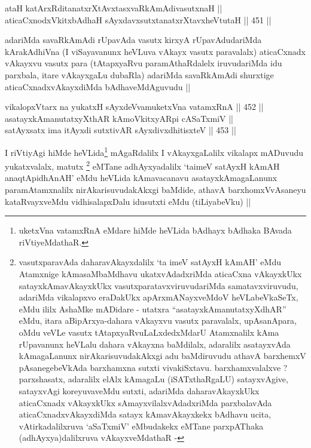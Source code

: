 \begin{shl}
ataH katArxRditanatxrXtAvxtasxvaRkAmAdivasutxnaH || \\
aticaCxnodxVkitxbAdhaH sAyxdavxsutxtanatxrXtavxheVtutaH ||  451 ||  
\end{shl}

\begin{artha}
adariMda savaRkAmAdi rUpavAda vasutx kirxyA rUpavAdudariMda
kArakAdhiVna (I viSayavanunx heVLuva vAkayx vasutx paravalalx)
aticaCxnadx vAkayxvu vasutx para (tAtapxyaRvu paramAthaRdalelx
iruvudariMda idu parxbala, itare vAkayxgaLu dubaRla) adariMda
savaRkAmAdi shurxtige aticaCxnadxvAkayxdiMda bAdhaveMdAguvudu ||
\end{artha}


\begin{shl}
vikalopxV\s tarx na yukatxH sAyxdeVvamuketxVna vatamxRnA || 452 || \\
asatayxkAmanutatxyXthAR kAmoVkitxyAR\s pi cASaTxmiV || \\
satAyxsatx ima itAyxdi sutxtivAR sAyxdivxdhitisxteV ||  453 ||  
\end{shl}

\begin{artha}
I riVtiyAgi hiMde heVLida\footnote{uketxVna vatamxRnA eMdare hiMde
  heVLida bAdhayx bAdhaka BAvada riVtiyeMdathaR.} mAgaRdalilx I vAkayxgaLalilx
vikalapx mADuvudu yukatxvalalx, matutx \footnote{vasutxparavAda
  daharavAkayxdalilx `ta imeV satAyxH kAmAH' eMdu Atamxnige
  kAmasaMbaMdhavu ukatxvAdadxriMda aticaCxna vAkayxkUkx
  satayxkAmavAkayxkUkx vasutxparatavxviruvudariMda samatavxviruvudu,
  adariMda vikalapxvo eraDakUkx apArxmANayxveMdoV heVLabeVkaSeTx, eMdu
  ililx AshaMke mADidare - utatxra ``asatayxkAmanutatxyXdhAR'' eMdu,
  itara aBipArxya-dahara vAkayxvu vasutx paravalalx, upAsanApara, oMdu
  veVLe vasutx tAtapxyaRvuLaLxdedxMdarU Atamxnalilx kAma rUpavanunx
  heVLalu dahara vAkayxna baMdilalx, adaralilx asatayxvAda
  kAmagaLanunx nirAkarisuvudakAkxgi adu baMdiruvudu athavA barxhemxV
  pAsanegebeVkAda barxhamxna sutxti vivakiSxtavu. barxhamxvalalxve ?
  parxshasatx, adaralilx elAlx kAmagaLu (iSATxthaRgaLU) satayxvAgive,
  satayxvAgi koreyuvaveMdu sutxti, adariMda daharavAkayxkUkx
  aticaCxnadx vAkayxkUkx sAmayxvilalxvAdadxriMda parxbalavAda
  aticaCxnadxvAkayxdiMda satayx kAmavAkayxkekx bAdhavu ucita,
  vAtirkadalilxruva `aSaTxmiV' eMbudakekx eMTane parxpAThaka
  (adhAyxya)dalilxruva vAkayxveMdathaR -} eMTane
adhAyxyadalilx `taimeV satAyxH kAmAH anaqtApidhAnAH' eMdu heVLida
kAmavacanavu asatayxkAmagaLanunx paramAtamxnalilx nirAkarisuvudakAkxgi
baMdide, athavA barxhomxVvAsaneyu kataRvayxveMdu vidhisalapxDalu
idusutxti eMdu (tiLiyabeVku) ||
\end{artha}

